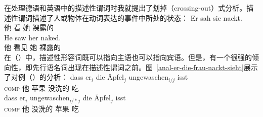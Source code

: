 在处理德语和英语中的描述性谓词时我就提出了划掉（crossing-out）式分析\citep{Mueller2004c,Mueller2008a}。描述性谓词描述了人或物体在动词表达的事件中所处的状态：
\eal
\ex 
\gll Er sah sie nackt.\footnotemark\\
	他 看 她 裸露的\\
\ex 
\gll He saw her naked.\\
	他 看见 她 裸露的\\
\zl
在（）中，描述性形容词既可以指向主语也可以指向宾语。但是，有一个很强的倾向性，即先行语名词出现在描述性谓词之前\citep[]{Loetscher85}。图~\vref{anal-er-die-frau-nackt-sieht}展示了对例（）的分析：
\eal
\ex 
\gll dass er$_i$ die Äpfel$_j$ ungewaschen$_{i/j}$ isst\\
	 \textsc{comp} 他  苹果 没洗的 吃\\
\ex 
\gll dass er$_i$ ungewaschen$_{i/*j}$ die Äpfel$_j$ isst\\
	 \textsc{comp} 他 没洗的  苹果 吃\\
\zl
